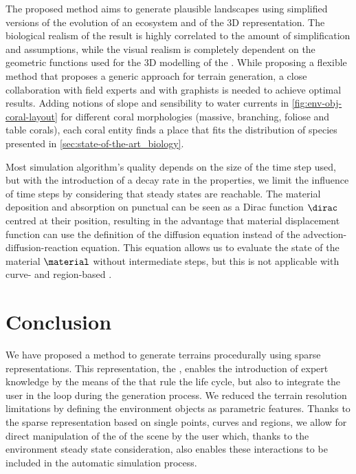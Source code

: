 The proposed method aims to generate plausible landscapes using simplified versions of the evolution of an ecosystem and of the 3D representation. The biological realism of the result is highly correlated to the amount of simplification and assumptions, while the visual realism is completely dependent on the geometric functions used for the 3D modelling of the . While proposing a flexible method that proposes a generic approach for terrain generation, a close collaboration with field experts and with graphists is needed to achieve optimal results. Adding notions of slope and sensibility to water currents in \cref{fig:env-obj-coral-layout} for different coral morphologies (massive, branching, foliose and table corals), each coral entity finds a place that fits the distribution of species presented in \cref{sec:state-of-the-art_biology}. 

Most simulation algorithm's quality depends on the size of the time step used, but with the introduction of a decay rate in the  properties, we limit the influence of time steps by considering that steady states are reachable. The material deposition and absorption on punctual  can be seen as a Dirac function $\dirac$ centred at their position, resulting in the advantage that material displacement function can use the definition of the diffusion equation instead of the advection-diffusion-reaction equation. This equation allows us to evaluate the state of the material $\material$ without intermediate steps, but this is not applicable with curve- and region-based .


\section{Conclusion}
\label{sec:env-obj-conclusion}
We have proposed a method to generate terrains procedurally using sparse representations. This representation, the , enables the introduction of expert knowledge by the means of the  that rule the  life cycle, but also to integrate the user in the loop during the generation process. We reduced the terrain resolution limitations by defining the environment objects as parametric features. Thanks to the sparse representation based on single points, curves and regions, we allow for direct manipulation of the  of the scene by the user which, thanks to the environment steady state consideration, also enables these interactions to be included in the automatic simulation process.

